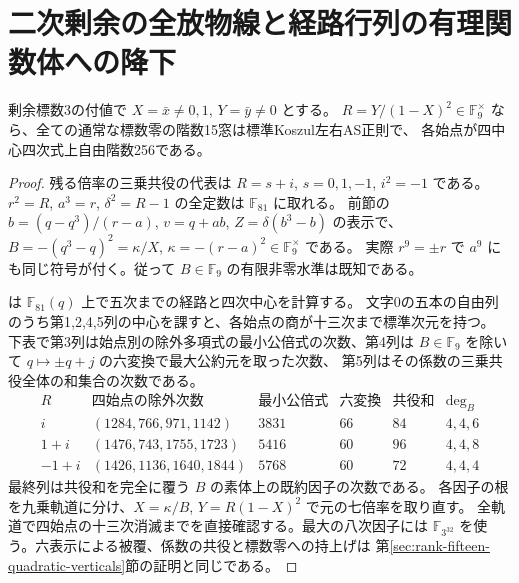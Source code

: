 \section{二次剰余の全放物線と経路行列の有理関数体への降下}
\label{sec:rank-fifteen-quadratic-parabolic-pencils}
\begin{theorem}
剰余標数3の付値で $X=\bar x\ne0,1$, $Y=\bar y\ne0$ とする。
$R=Y/(1-X)^2\in\mathbb F_9^\times$ なら、全ての通常な標数零の階数15窓は標準Koszul左右AS正則で、
各始点が四中心四次式上自由階数256である。
\end{theorem}
\begin{proof}
残る倍率の三乗共役の代表は $R=s+i$, $s=0,1,-1$, $i^2=-1$ である。
$r^2=R$, $a^3=r$, $\delta^2=R-1$ の全定数は $\mathbb F_{81}$ に取れる。
前節の $b=(q-q^3)/(r-a)$, $v=q+ab$, $Z=\delta(b^3-b)$ の表示で、
$B=-(q^3-q)^2=\kappa/X$, $\kappa=-(r-a)^2\in\mathbb F_9^\times$ である。
実際 $r^9=\pm r$ で $a^9$ にも同じ符号が付く。従って $B\in\mathbb F_9$ の有限非零水準は既知である。

 は
$\mathbb F_{81}(q)$ 上で五次までの経路と四次中心を計算する。
文字0の五本の自由列のうち第1,2,4,5列の中心を課すと、各始点の商が十三次まで標準次元を持つ。
下表で第3列は始点別の除外多項式の最小公倍式の次数、第4列は
$B\in\mathbb F_9$ を除いて $q\mapsto\pm q+j$ の六変換で最大公約元を取った次数、
第5列はその係数の三乗共役全体の和集合の次数である。
\[
\begin{array}{c|c|r|r|r|c}
R&\text{四始点の除外次数}&\text{最小公倍式}&\text{六変換}&\text{共役和}&\deg_B\\\hline
i &(1284,766,971,1142)&3831&66&84&4,4,6\\
1+i &(1476,743,1755,1723)&5416&60&96&4,4,8\\
-1+i &(1426,1136,1640,1844)&5768&60&72&4,4,4
\end{array}
\]
最終列は共役和を完全に覆う $B$ の素体上の既約因子の次数である。
各因子の根を九乗軌道に分け、$X=\kappa/B$, $Y=R(1-X)^2$ で元の七倍率を取り直す。
全軌道で四始点の十三次消滅までを直接確認する。最大の八次因子には
$\mathbb F_{3^{32}}$ を使う。六表示による被覆、係数の共役と標数零への持上げは
第\ref{sec:rank-fifteen-quadratic-verticals}節の証明と同じである。
\end{proof}

